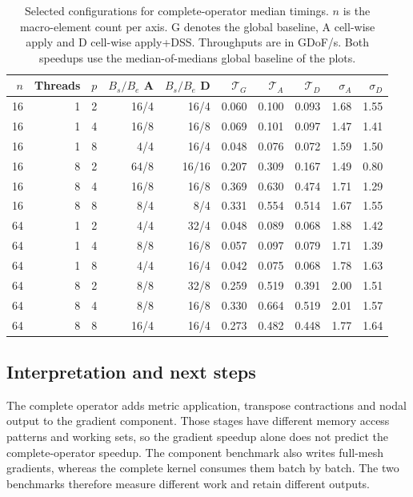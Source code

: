 \documentclass[11pt]{article}
\begin{document}
\begin{table}[htbp]
 \centering\small
 \setlength{\tabcolsep}{3.5pt}
 \begin{tabular}{rrrrrrrrrr}
 \toprule
 $n$ & Threads & $p$ & $B_s/B_e$ A & $B_s/B_e$ D
 & $\mathcal T_G$ & $\mathcal T_A$ & $\mathcal T_D$
 & $\sigma_A$ & $\sigma_D$\\
 \midrule
 16 & 1 & 2 & 16/4 & 16/4 & 0.060 & 0.100 & 0.093 & 1.68 & 1.55\\
 16 & 1 & 4 & 16/8 & 16/8 & 0.069 & 0.101 & 0.097 & 1.47 & 1.41\\
 16 & 1 & 8 & 4/4 & 16/4 & 0.048 & 0.076 & 0.072 & 1.59 & 1.50\\
 16 & 8 & 2 & 64/8 & 16/16 & 0.207 & 0.309 & 0.167 & 1.49 & 0.80\\
 16 & 8 & 4 & 16/8 & 16/8 & 0.369 & 0.630 & 0.474 & 1.71 & 1.29\\
 16 & 8 & 8 & 8/4 & 8/4 & 0.331 & 0.554 & 0.514 & 1.67 & 1.55\\
 \midrule
 64 & 1 & 2 & 4/4 & 32/4 & 0.048 & 0.089 & 0.068 & 1.88 & 1.42\\
 64 & 1 & 4 & 8/8 & 16/8 & 0.057 & 0.097 & 0.079 & 1.71 & 1.39\\
 64 & 1 & 8 & 4/4 & 16/4 & 0.042 & 0.075 & 0.068 & 1.78 & 1.63\\
 64 & 8 & 2 & 8/8 & 32/8 & 0.259 & 0.519 & 0.391 & 2.00 & 1.51\\
 64 & 8 & 4 & 8/8 & 16/8 & 0.330 & 0.664 & 0.519 & 2.01 & 1.57\\
 64 & 8 & 8 & 16/4 & 16/4 & 0.273 & 0.482 & 0.448 & 1.77 & 1.64\\
 \bottomrule
 \end{tabular}
 \caption{Selected configurations for complete-operator median timings.
 \(n\) is the macro-element count per axis. G denotes the global baseline,
 A cell-wise apply and D cell-wise apply+DSS. Throughputs are in GDoF/s.
 Both speedups use the median-of-medians global baseline of the plots.}
 \label{tab:affine-best}
\end{table}

\FloatBarrier
\subsection{Interpretation and next steps}

The complete operator adds metric application, transpose contractions and
nodal output to the gradient component. Those stages have different memory
access patterns and working sets, so the gradient speedup alone does not
predict the complete-operator speedup. The component benchmark also writes
full-mesh gradients, whereas the complete kernel consumes them batch by batch.
The two benchmarks therefore measure different work and retain different
outputs.
\end{document}
